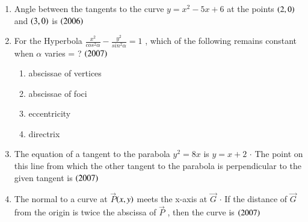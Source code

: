 \documentclass[journal,12pt,twocolumn]{IEEEtran}
\theoremstyle{remark}
\begin{document}
\begin{enumerate}
\hfill
\item Angle between the tangents to the curve {$ y = x^2 -5x + 6 $} at the points {$ \left(2,0\right) $} and {$ \left(3,0\right) $} is
\hfill
\hfill{{$ \left(2006\right) $}}
\begin{enumerate}[label=(\alph*)]
\end{enumerate}
\hfill
\item For the Hyperbola {$ \frac{x^2}{cos^2 \alpha} - \frac{y^2}{sin^2 \alpha} = 1 $} , which of the  following remains constant when {$ \alpha $} varies = ? 
\hfill
\hfill{{$ \left(2007\right) $}}
\begin{enumerate}[label=(\alph*)]
\item abscissae of vertices 
\item abscissae of foci
\item eccentricity
\item directrix
\end{enumerate}
\hfill
\item The equation of a tangent to the parabola {$ y^2 = 8x $} is {$ y = x + 2 $} {$ \cdot $}  The point on this line from which the other tangent to the parabola is perpendicular to the given tangent is
\hfill 
\hfill{{$\left(2007\right)$}}
\begin{enumerate}[label=(\alph*)]
\end{enumerate}
\hfill
\item The normal to a curve at {$\vec{P}$}{$ \left(x, y\right) $} meets the x-axis at {$\vec{G}$} {$ \cdot $} If the distance of {$ \vec{G} $} from the origin is twice the abscissa of {$\vec{P}$} , then the curve is \hfill {{$ \left(2007\right) $}}
\begin{enumerate}[label=(\alph*)]
\end{enumerate}
\end{enumerate}
\end{document}
